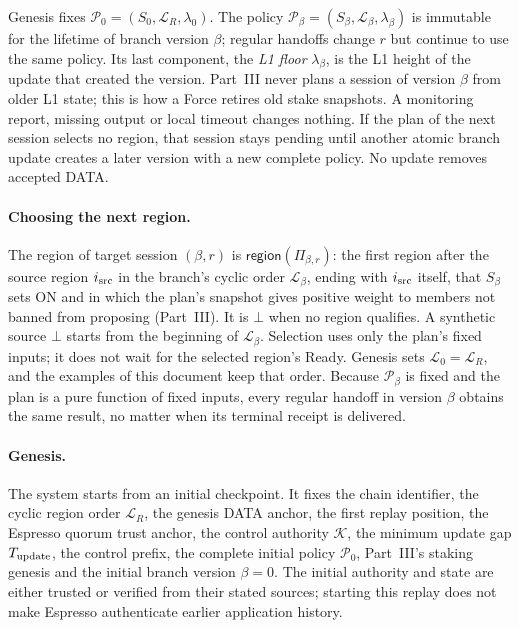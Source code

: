 \documentclass[11pt,a4paper]{article}
\newcommand{\tagg}[1]{\ensuremath{\mathsf{#1}}}
\newcommand{\defterm}[1]{\textcolor{rrBlue}{\textit{#1}}}
\begin{document}
Genesis fixes $\mathcal P_0=(S_0,\mathcal L_R,\lambda_0)$.  The policy
$\mathcal P_\beta=(S_\beta,\mathcal L_\beta,\lambda_\beta)$ is immutable for
the lifetime of branch version $\beta$; regular handoffs change $r$ but
continue to use the same policy. Its last component, the \defterm{L1
floor} $\lambda_\beta$, is the L1 height of the update that created the
version. Part~III never plans a session of version $\beta$ from older L1
state; this is how a Force retires old stake snapshots.
A monitoring report, missing output or local timeout changes nothing.  If
the plan of the next session selects no region, that session stays
pending until another atomic branch update creates a later version with a
new complete policy.  No update removes accepted DATA.

\paragraph{Choosing the next region.}
The region of target session $(\beta,r)$ is $\tagg{region}(\Pi_{\beta,r})$:
the first region after the source region $i_{\rm src}$ in the branch's
cyclic order $\mathcal L_\beta$, ending with $i_{\rm src}$ itself, that
$S_\beta$ sets ON and in which the plan's snapshot gives positive weight
to members not banned from proposing (Part~III). It is $\bot$ when no
region qualifies. A synthetic source $\bot$ starts from the beginning of
$\mathcal L_\beta$. Selection uses only the plan's fixed inputs; it does
not wait for the selected region's Ready. Genesis sets
$\mathcal L_0=\mathcal L_R$, and the examples of this document keep that
order. Because $\mathcal P_\beta$ is fixed and the plan is a pure
function of fixed inputs, every regular handoff in version $\beta$
obtains the same result, no matter when its terminal receipt is
delivered.

\paragraph{Genesis.}
The system starts from an initial checkpoint. It fixes the chain
identifier, the cyclic region order $\mathcal L_R$, the genesis DATA
anchor, the first replay position, the Espresso quorum trust anchor,
the control authority $\mathcal K$, the minimum update gap
$T_{\rm update}$, the control prefix, the complete initial policy
$\mathcal P_0$, Part~III's staking genesis and the initial branch version
$\beta=0$. The initial authority and state are either trusted or verified
from their stated sources; starting this replay does not make Espresso
authenticate earlier application history.
\end{document}
